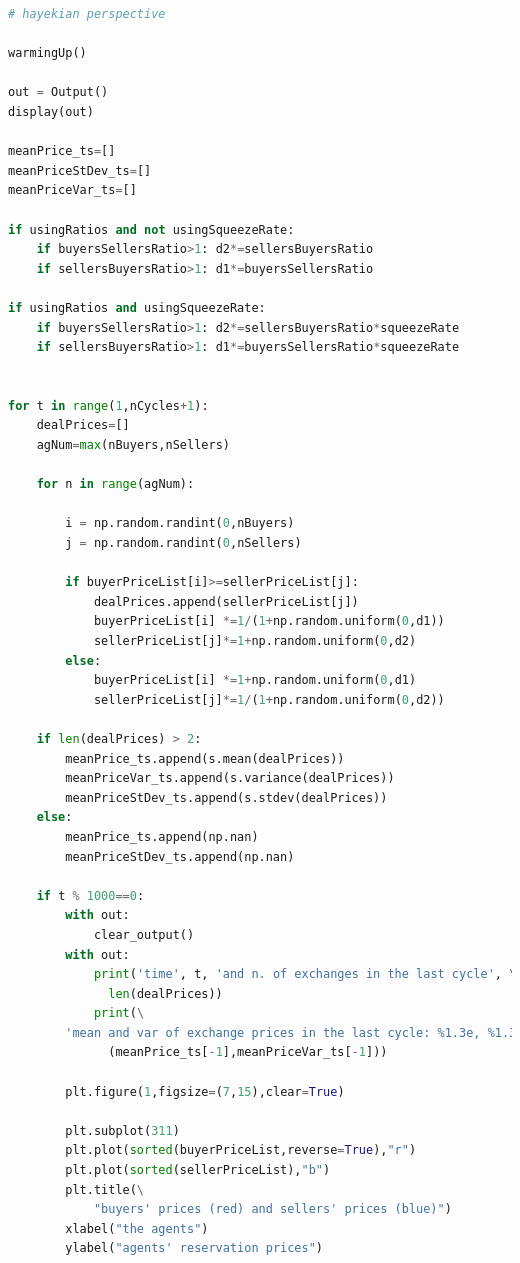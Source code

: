 \documentclass[10pt]{report}
\begin{document}
\begin{lstlisting}[language=Python, caption=The model in the simplified hayekian perspective, basicstyle=\ttfamily\footnotesize]
# hayekian perspective

warmingUp()

out = Output()
display(out)

meanPrice_ts=[]
meanPriceStDev_ts=[]
meanPriceVar_ts=[]

if usingRatios and not usingSqueezeRate:
    if buyersSellersRatio>1: d2*=sellersBuyersRatio
    if sellersBuyersRatio>1: d1*=buyersSellersRatio
        
if usingRatios and usingSqueezeRate:
    if buyersSellersRatio>1: d2*=sellersBuyersRatio*squeezeRate
    if sellersBuyersRatio>1: d1*=buyersSellersRatio*squeezeRate
    

for t in range(1,nCycles+1):    
    dealPrices=[]
    agNum=max(nBuyers,nSellers)

    for n in range(agNum):

        i = np.random.randint(0,nBuyers)
        j = np.random.randint(0,nSellers)
        
        if buyerPriceList[i]>=sellerPriceList[j]:
            dealPrices.append(sellerPriceList[j])
            buyerPriceList[i] *=1/(1+np.random.uniform(0,d1))
            sellerPriceList[j]*=1+np.random.uniform(0,d2)
        else:
            buyerPriceList[i] *=1+np.random.uniform(0,d1)
            sellerPriceList[j]*=1/(1+np.random.uniform(0,d2))
           
    if len(dealPrices) > 2:
        meanPrice_ts.append(s.mean(dealPrices))
        meanPriceVar_ts.append(s.variance(dealPrices))
        meanPriceStDev_ts.append(s.stdev(dealPrices))
    else:
        meanPrice_ts.append(np.nan)
        meanPriceStDev_ts.append(np.nan)

    if t % 1000==0:
        with out:
            clear_output()
        with out:
            print('time', t, 'and n. of exchanges in the last cycle', \
              len(dealPrices))
            print(\
        'mean and var of exchange prices in the last cycle: %1.3e, %1.3e' %\
              (meanPrice_ts[-1],meanPriceVar_ts[-1]))

        plt.figure(1,figsize=(7,15),clear=True)

        plt.subplot(311)
        plt.plot(sorted(buyerPriceList,reverse=True),"r")
        plt.plot(sorted(sellerPriceList),"b")
        plt.title(\
            "buyers' prices (red) and sellers' prices (blue)")
        xlabel("the agents")
        ylabel("agents' reservation prices")


\end{lstlisting}
\end{document}
